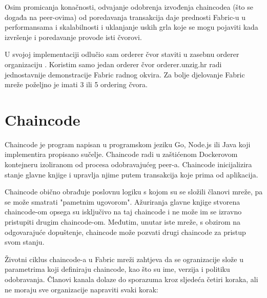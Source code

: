 \documentclass[times, utf8, diplomski]{fer}
\begin{document}
Osim promicanja konačnosti,  odvajanje odobrenja izvođenja chaincodea (što se događa na peer-ovima) od poredavanja transakcija daje prednosti Fabric-u u performansama i skalabilnosti i uklanjanje uskih grla koje se mogu pojaviti kada izvršenje i poredavanje provode isti čvorovi.

U svojoj implementaciji odlučio sam orderer čvor staviti u zasebnu orderer organizaciju .  Koristim samo jedan orderer čvor orderer.unzig.hr radi jednostavnije demonstracije Fabric radnog okvira. Za bolje djelovanje Fabric mreže poželjno je imati 3 ili 5 ordering čvora. 


\section{Chaincode}
Chaincode je program napisan u programskom jeziku Go,  Node.js ili Java koji implementira propisano sučelje.  Chaincode radi u zaštićenom Dockerovom kontejneru izoliranom od procesa odobravajućeg peer-a.  Chaincode inicijalizira stanje glavne knjige i upravlja njime putem transakcija koje prima od aplikacija.

Chaincode obično obrađuje poslovnu logiku s kojom su se složili članovi mreže, pa se može smatrati "pametnim ugovorom". Ažuriranja glavne knjige stvorena chaincode-om opsega su isključivo na taj chaincode i ne može im se izravno pristupiti drugim chaincode-om. Međutim, unutar iste mreže, s obzirom na odgovarajuće dopuštenje,  chaincode može pozvati drugi chaincode za pristup svom stanju.

Životni ciklus chaincode-a u Fabric mreži zahtjeva da se ogranizacije slože u parametrima koji definiraju chaincode, kao što su ime, verzija i politiku odobravanja.  Članovi kanala dolaze do sporazuma kroz sljedeća četiri koraka, ali ne moraju sve organizacije napraviti svaki korak:
\end{document}
